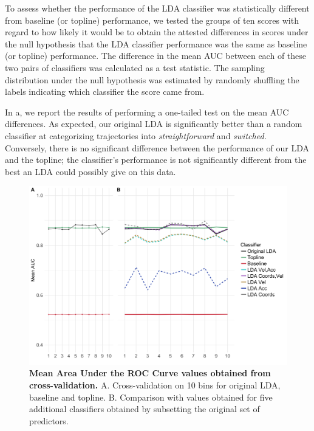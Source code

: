 \documentclass[11pt]{article}
\begin{document}
To assess whether the performance of the LDA classifier was statistically different from baseline (or topline) performance, we tested the groups of ten scores with regard to how likely it would be to obtain the attested differences in scores under the null hypothesis that the LDA classifier performance was the same as baseline (or topline) performance.   
The difference in the mean AUC between each of these two pairs of classifiers was calculated as a test statistic. The sampling distribution under the null hypothesis was estimated by randomly shuffling the labels indicating which classifier the score came from.

In a, we report the results of performing a one-tailed test on the mean AUC differences. As expected, our original LDA is significantly better than a random classifier at categorizing trajectories into \emph{straightforward} and \emph{switched.} Conversely, there is no significant difference between the performance of our LDA and the topline; the classifier's performance is not significantly different from the best an LDA could possibly give on this data. 

\begin{figure}[h]
\centering
\includegraphics[width=\textwidth]{auc_calibration_1.png}
\caption{\textbf{Mean Area Under the ROC Curve values obtained from cross-validation.} A. Cross-validation on 10 bins for original LDA, baseline and topline. B. Comparison with values obtained for five additional classifiers obtained by subsetting the original set of predictors.} \label{DIST:AUC}
\end{figure}
\end{document}
